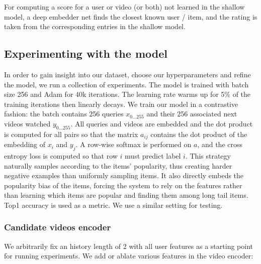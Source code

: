 For computing a score for a user or video (or both) not learned in the shallow model, a deep embedder net finds the closest known user / item, and the rating is taken from the corresponding entries in the shallow model.

\subsection{Experimenting with the model}

In order to gain insight into our dataset, choose our hyperparameters and refine the model, we run a collection of experiments. The model is trained with batch size 256 and Adam for 40k iterations. The learning rate warms up for 5\% of the training iterations then linearly decays. We train our model in a contrastive fashion: the batch contains 256 queries $x_{0...255}$ and their 256 associated next videos watched $y_{0...255}$. All queries and videos are embedded and the dot product is computed for all pairs so that the matrix $a_{ij}$ contains the dot product of the embedding of $x_i$ and $y_j$. A row-wise softmax is performed on $a$, and the cross entropy loss is computed so that row $i$ must predict label $i$. This strategy naturally samples according to the items' popularity, thus creating harder negative examples than uniformly sampling items. It also directly embeds the popularity bias of the items, forcing the system to rely on the features rather than learning which items are popular and finding them among long tail items. Top1 accuracy is used as a metric. We use a similar setting for testing.


\subsubsection{Candidate videos encoder}

We arbitrarily fix an history length of 2 with all user features as a starting point for running experiments. We add or ablate various features in the video encoder:

